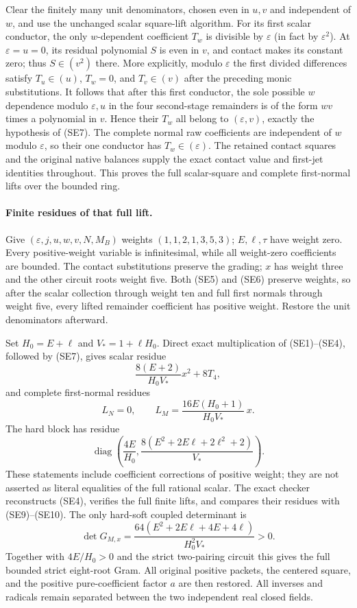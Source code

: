 Clear the finitely many unit denominators, chosen even in $u,v$ and
independent of $w$, and use the unchanged scalar square-lift algorithm.
For its first scalar conductor, the only $w$-dependent coefficient
$T_w$ is divisible by $\varepsilon$ (in fact by $\varepsilon^2$).
At $\varepsilon=u=0$, its residual polynomial $S$ is even in $v$,
and contact makes its constant zero; thus $S\in(v^2)$ there.
More explicitly, modulo $\varepsilon$ the first divided differences
satisfy $T_u\in(u)$, $T_w=0$, and $T_v\in(v)$ after the preceding
monic substitutions. It follows
that after this first conductor, the sole possible $w$ dependence
modulo $\varepsilon,u$ in the four second-stage remainders is of the
form $w v$ times a polynomial in $v$. Hence their $T_w$ all belong to
$(\varepsilon,v)$, exactly the hypothesis of (SE7). The complete
normal raw coefficients are independent of $w$ modulo $\varepsilon$,
so their one conductor has $T_w\in(\varepsilon)$. The retained contact
squares and the original native balances supply the exact contact
value and first-jet identities throughout. This proves the full
scalar-square and complete first-normal lifts over the bounded ring.

\paragraph{Finite residues of that full lift.}
Give $(\varepsilon,j,u,w,v,N,M_B)$ weights $(1,1,2,1,3,5,3)$;
$E,\ell,\tau$ have weight zero. Every positive-weight variable is
infinitesimal, while all weight-zero coefficients are bounded.
The contact substitutions preserve the grading; $x$ has weight three
and the other circuit roots weight five. Both (SE5) and (SE6) preserve
weights, so after the scalar collection through weight ten and full
first normals through weight five, every lifted remainder coefficient
has positive weight. Restore the unit denominators afterward.

Set $H_0=E+\ell$ and $V_*=1+\ell H_0$. Direct exact multiplication of
(SE1)--(SE4), followed by (SE7), gives scalar residue
\[
       \frac{8(E+2)}{H_0V_*}x^2+8T_4,                         \tag{SE9}
\]
and complete first-normal residues
\[
       L_N=0,\qquad L_M=\frac{16E(H_0+1)}{H_0V_*}\,x.
\]
The hard block has residue
\[
 \operatorname{diag}\left(\frac{4E}{H_0},
           \frac{8(E^2+2E\ell+2\ell^2+2)}{V_*}\right).       \tag{SE10}
\]
These statements include coefficient corrections of positive weight;
they are not asserted as literal equalities of the full rational scalar.
The exact checker reconstructs (SE4), verifies the full finite lifts,
and compares their residues with (SE9)--(SE10).
The only hard-soft coupled determinant is
\[
 \det G_{M,x}
 =\frac{64(E^2+2E\ell+4E+4\ell)}{H_0^2V_*}>0.              \tag{SE11}
\]
Together with $4E/H_0>0$ and the strict two-pairing circuit this gives
the full bounded strict eight-root Gram. All original positive packets,
the centered square, and the positive pure-coefficient factor $a$ are
then restored. All inverses and radicals remain separated between the
two independent real closed fields.
